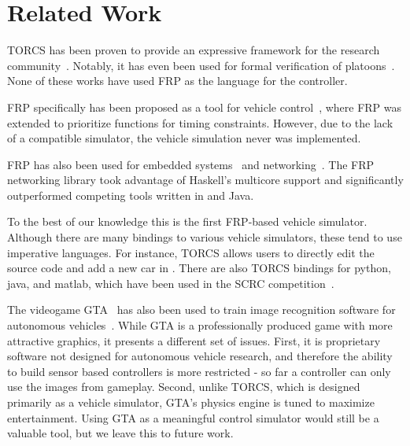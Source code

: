 \section{Related Work}

TORCS has been proven to provide an expressive framework for the research community~\cite{OnievaPAMP09,conf/cig/CardamoneLL09,conf/cig/MunozGS10}. 
Notably, it has even been used for formal verification of platoons~\cite{kamali2016formal,xu2016experimental}. 
None of these works have used FRP as the language for the controller.


FRP specifically has been proposed as a tool for vehicle control~\cite{kazemi2016,zou2016}, where FRP was extended to prioritize functions for timing constraints. However, due to the lack of a compatible simulator, the vehicle simulation never was implemented. 

FRP has also been used for embedded systems~\cite{helbling2016juniper} and networking~\cite{voellmy2012scalable}.
The FRP networking library took advantage of Haskell's multicore support and significantly outperformed competing tools written in \CC and Java.


To the best of our knowledge this is the first FRP-based vehicle simulator.
Although there are many bindings to various vehicle simulators, these tend to use imperative languages.
For instance, TORCS allows users to directly edit the source code and add a new car 
in \CC.
There are also TORCS bindings for python, java, and matlab, which have been used in the SCRC competition~\cite{SCRC}.

The videogame GTA~\cite{gtaV} has also been used to train image recognition software for autonomous vehicles~\cite{gtaPrinceton}.
While GTA is a professionally produced game with more attractive graphics, it presents a different set of issues.
First, it is proprietary software not designed for autonomous vehicle research, and therefore the ability to build sensor based controllers is more restricted - so far a controller can only use the images from gameplay. 
Second, unlike TORCS, which is designed primarily as a vehicle simulator, GTA's physics engine is tuned to maximize entertainment.
Using GTA as a meaningful control simulator would still be a valuable tool, but we leave this to future work.
